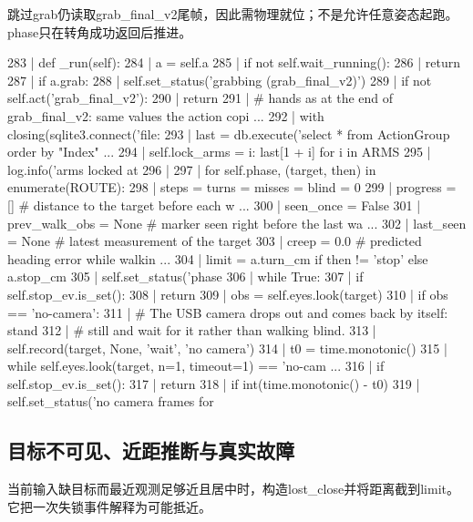 跳过grab仍读取grab\_final\_v2尾帧，因此需物理就位；不是允许任意姿态起跑。phase只在转角成功返回后推进。
\begin{CodeBlock}
 283 |     def _run(self):
 284 |         a = self.a
 285 |         if not self.wait_running():
 286 |             return
 287 |         if a.grab:
 288 |             self.set_status('grabbing (grab_final_v2)')
 289 |             if not self.act('grab_final_v2'):
 290 |                 return
 291 |         # hands as at the end of grab_final_v2: same values the action copi ...
 292 |         with closing(sqlite3.connect('file:%
 293 |             last = db.execute('select * from ActionGroup order by "Index"   ...
 294 |         self.lock_arms = {i: last[1 + i] for i in ARMS}
 295 |         log.info('arms locked at %
 296 | 
 297 |         for self.phase, (target, then) in enumerate(ROUTE):
 298 |             steps = turns = misses = blind = 0
 299 |             progress = []            # distance to the target before each w ...
 300 |             seen_once = False
 301 |             prev_walk_obs = None     # marker seen right before the last wa ...
 302 |             last_seen = None         # latest measurement of the target
 303 |             creep = 0.0              # predicted heading error while walkin ...
 304 |             limit = a.turn_cm if then != 'stop' else a.stop_cm
 305 |             self.set_status('phase %
 306 |             while True:
 307 |                 if self.stop_ev.is_set():
 308 |                     return
 309 |                 obs = self.eyes.look(target)
 310 |                 if obs == 'no-camera':
 311 |                     # The USB camera drops out and comes back by itself: stand
 312 |                     # still and wait for it rather than walking blind.
 313 |                     self.record(target, None, 'wait', 'no camera')
 314 |                     t0 = time.monotonic()
 315 |                     while self.eyes.look(target, n=1, timeout=1) == 'no-cam ...
 316 |                         if self.stop_ev.is_set():
 317 |                             return
 318 |                         if int(time.monotonic() - t0) %
 319 |                             self.set_status('no camera frames for %
\end{CodeBlock}
\subsection{目标不可见、近距推断与真实故障}
当前输入缺目标而最近观测足够近且居中时，构造lost\_close并将距离截到limit。它把一次失锁事件解释为可能抵近。

